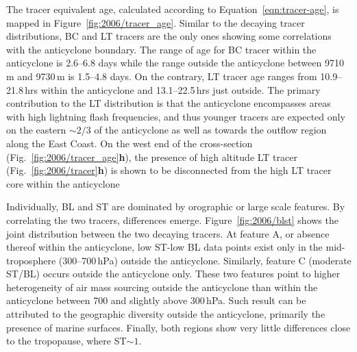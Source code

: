 The tracer equivalent age, calculated according to Equation~\ref{eqn:tracer-age}, is mapped in Figure~\ref{fig:2006/tracer_age}.
Similar to the decaying tracer distributions, BC and LT tracers are the only ones showing some correlations with the anticyclone boundary.
The range of age for BC tracer within the anticyclone is 2.6--6.8 days while the range outside the anticyclone between 9710\,\unit{m} and
9730\,\unit{m} is 1.5--4.8 days. On the contrary, LT tracer age ranges from 10.9--21.8\,\unit{hrs} within the anticyclone and 13.1--22.5\,\unit{hrs}
just outside. The primary contribution to the LT distribution is that the anticyclone encompasses areas with high lightning flash frequencies,
and thus younger tracers are expected only on the eastern $\sim2/3$ of the anticyclone as well as towards the outflow region along
the East Coast. On the west end of the cross-section (Fig.~\ref{fig:2006/tracer_age}{\bf h}), the presence of high altitude LT tracer
(Fig.~\ref{fig:2006/tracer}{\bf h}) is shown to be disconnected from the high LT tracer core within the anticyclone


Individually, BL and ST are dominated by orographic or large scale features. By correlating the two tracers, differences emerge.
Figure~\ref{fig:2006/blst} shows the joint distribution between the two decaying tracers. At feature A, or absence thereof within the
anticyclone, low ST-low BL data points exist only in the mid-troposphere (300--700\,\unit{hPa}) outside the anticyclone. Similarly,
feature C (moderate ST/BL) occurs outside the anticyclone only. These two features point to higher heterogeneity of air mass sourcing
outside the anticyclone than within the anticyclone between 700 and slightly above 300\,\unit{hPa}. Such result can be attributed to
the geographic diversity outside the anticyclone, primarily the presence of marine surfaces. Finally, both regions show very little
differences close to the tropopause, where ST$\sim1$.

